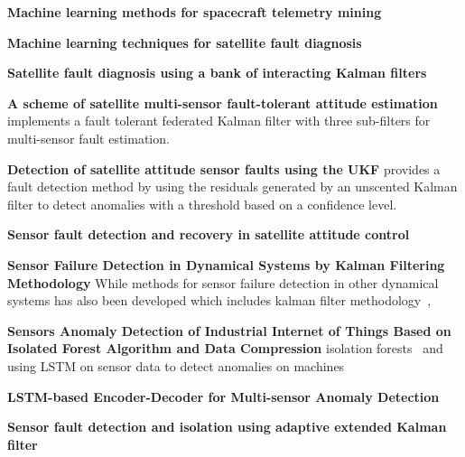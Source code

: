 \textbf{Machine learning methods for spacecraft telemetry mining}
\cite{ibrahim2018machine}

\textbf{Machine learning techniques for satellite fault diagnosis}
\cite{ibrahim2020machine}

\textbf{Satellite fault diagnosis using a bank of interacting Kalman filters}
\cite{Tudoroiu2007}

\textbf{A scheme of satellite multi-sensor fault-tolerant attitude estimation}
\cite{Zhou2016} implements a fault tolerant federated Kalman filter with three sub-filters for multi-sensor fault estimation. 

\textbf{Detection of satellite attitude sensor faults using the UKF}
\cite{Xiong2007} provides a fault detection method by using the residuals generated by an unscented Kalman filter to detect anomalies with a threshold based on a confidence level. 


\textbf{Sensor fault detection and recovery in satellite attitude control}
\cite{Nasrolahi2018} 

\textbf{Sensor Failure Detection in Dynamical Systems by Kalman Filtering Methodology}
While methods for sensor failure detection in other dynamical systems has also been developed which includes kalman filter methodology~\cite{Ciftciogl1991},

\textbf{Sensors Anomaly Detection of Industrial Internet of Things Based on Isolated Forest Algorithm and Data Compression}
isolation forests~\cite{Liu2021} and using LSTM on sensor data to detect anomalies on machines 

\textbf{LSTM-based Encoder-Decoder for Multi-sensor Anomaly Detection}
\cite{Malhotra2016}

\textbf{Sensor fault detection and isolation using adaptive extended Kalman filter}
\cite{van2012sensor}

